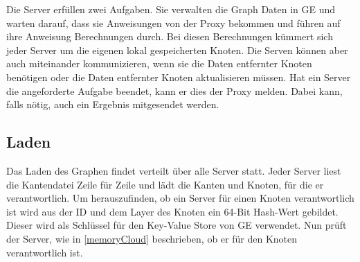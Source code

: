 Die Server erfüllen zwei Aufgaben. Sie verwalten die Graph Daten in GE und warten darauf, dass sie Anweisungen von der Proxy bekommen und führen auf ihre Anweisung Berechnungen durch. Bei diesen Berechnungen kümmert sich jeder Server 
um die eigenen lokal gespeicherten Knoten. Die Serven können aber auch miteinander kommunizieren, wenn sie die Daten entfernter Knoten benötigen oder die Daten entfernter Knoten
aktualisieren müssen.
Hat ein Server die angeforderte Aufgabe beendet, kann er dies der Proxy melden. Dabei kann, falls nötig, auch ein Ergebnis mitgesendet werden.


\subsection{Laden}

Das Laden des Graphen findet verteilt über alle Server statt. Jeder Server liest die Kantendatei Zeile für Zeile und lädt die Kanten und Knoten, für die er verantwortlich.
Um herauszufinden, ob ein Server für einen Knoten verantwortlich ist wird aus der ID und dem Layer des Knoten ein 64-Bit Hash-Wert gebildet. Dieser wird als Schlüssel für den Key-Value Store von GE verwendet.
Nun prüft der Server, wie in \ref{memoryCloud} beschrieben, ob er für den Knoten verantwortlich ist.

